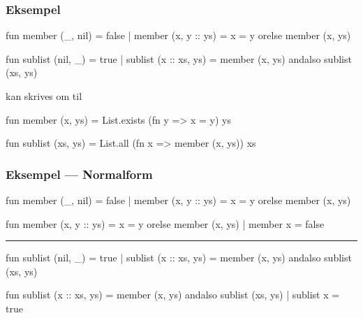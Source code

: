 \documentclass[slidestop,compress,mathserif, xcolor=dvipsnames]{beamer}
\begin{document}
\begin{frame}[fragile]
  \frametitle{Eksempel}

  \begin{block}{}
    \begin{sml}
      fun member (_, nil) = false
        | member (x, y :: ys) = x = y orelse member (x, ys)

      fun sublist (nil, _) = true
        | sublist (x :: xs, ys) = member (x, ys) andalso sublist (xs, ys)
    \end{sml}
  \end{block}
  kan skrives om til
  \begin{block}{}
    \begin{sml}
      fun member (x, ys) = List.exists (fn y => x = y) ys

      fun sublist (xs, ys) = List.all (fn x => member (x, ys)) xs
    \end{sml}
  \end{block}
\end{frame}

\begin{frame}[fragile]
  \frametitle{Eksempel --- Normalform}

  \begin{block}{}
    \begin{sml}
      fun member (_, nil) = false
        | member (x, y :: ys) = x = y orelse member (x, ys)
    \end{sml}
  \end{block}
  \begin{block}{}
    \begin{sml}
      fun member (x, y :: ys) = x = y orelse member (x, ys)
        | member x = false
    \end{sml}
  \end{block}
  \vspace{5pt}\hrule
  \begin{block}{}
    \begin{sml}
      fun sublist (nil, _) = true
        | sublist (x :: xs, ys) = member (x, ys) andalso sublist (xs, ys)
    \end{sml}
  \end{block}
  \begin{block}{}
    \begin{sml}
      fun sublist (x :: xs, ys) = member (x, ys) andalso sublist (xs, ys)
        | sublist x = true
    \end{sml}
  \end{block}
\end{frame}
\end{document}
